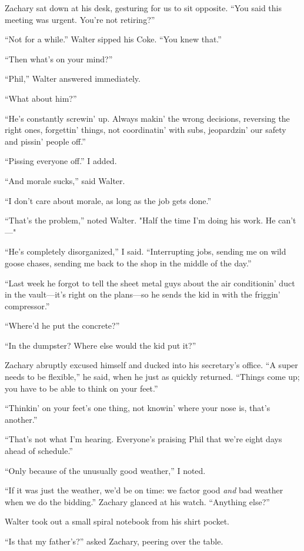 Zachary sat down at his desk, gesturing for us to sit opposite. ``You
said this meeting was urgent. You're not retiring?''

``Not for a while.'' Walter sipped his Coke. ``You knew that.''

``Then what's on your mind?''

``Phil,'' Walter answered immediately.

``What about him?''

``He's constantly screwin' up. Always makin' the wrong decisions,
reversing the right ones, forgettin' things, not coordinatin' with subs,
jeopardzin' our safety and pissin' people off.''

``Pissing everyone off.'' I added.

``And morale sucks,'' said Walter.

``I don't care about morale, as long as the job gets done.''

``That's the problem,'' noted Walter. "Half the time I'm doing his work.
He can't---"

``He's completely disorganized,'' I said. ``Interrupting jobs, sending
me on wild goose chases, sending me back to the shop in the middle of
the day.''

``Last week he forgot to tell the sheet metal guys about the air
conditionin' duct in the vault---it's right on the plans---so he sends
the kid in with the friggin' compressor.''

``Where'd he put the concrete?''

``In the dumpster? Where else would the kid put it?''

Zachary abruptly excused himself and ducked into his secretary's office.
``A super needs to be flexible,'' he said, when he just as quickly
returned. ``Things come up; you have to be able to think on your feet.''

``Thinkin' on your feet's one thing, not knowin' where your nose is,
that's another.''

``That's not what I'm hearing. Everyone's praising Phil that we're eight
days ahead of schedule.''

``Only because of the unusually good weather,'' I noted.

``If it was just the weather, we'd be on time: we factor good \emph{and}
bad weather when we do the bidding.'' Zachary glanced at his watch.
``Anything else?''

Walter took out a small spiral notebook from his shirt pocket.

``Is that my father's?'' asked Zachary, peering over the table.


